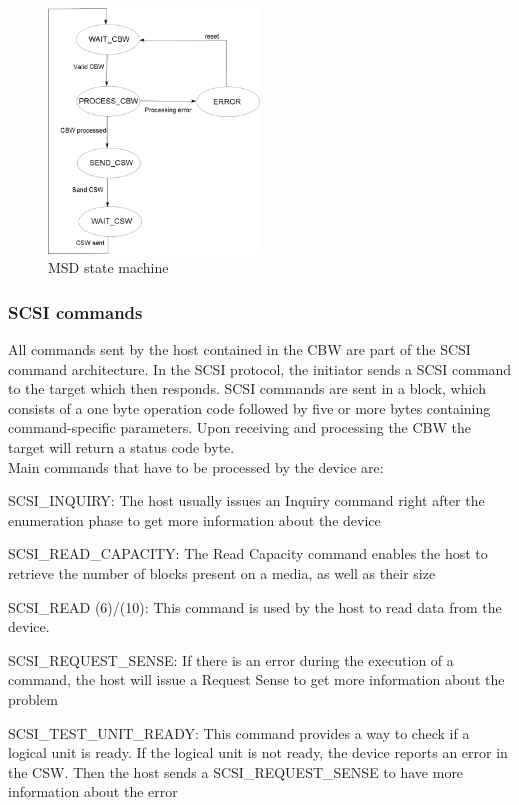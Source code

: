 \documentclass[pdftex,10pt,a4paper]{report}
\newenvironment{packed_item}{
\begin{itemize}
  \setlength{\itemsep}{1pt}
  \setlength{\parskip}{0pt}
  \setlength{\parsep}{0pt}
}{\end{itemize}}
\begin{document}
\begin{figure}[h!]
		\centering
		\includegraphics[width=0.5\textwidth]{./msd_state_machine.jpg}
		\caption{MSD state machine}
		\label{MSD state machine}
\end{figure}


\subsubsection{SCSI commands}
All commands sent by the host contained in the CBW are part of the SCSI command architecture. In the SCSI protocol, the initiator sends a SCSI command to the target which then responds. SCSI commands are sent in a block, which consists of a one byte operation code followed by five or more bytes containing command-specific parameters. Upon receiving and processing the CBW the target will return a status code byte.\\


Main commands that have to be processed by the device are:
\begin{packed_item}
	\item SCSI\_INQUIRY: The host usually issues an Inquiry command right after the enumeration phase to get more
information about the device

	\item SCSI\_READ\_CAPACITY: The Read Capacity command enables the host to retrieve the number of blocks present on a
media, as well as their size

	\item SCSI\_READ (6)/(10): This command is used by the host to read data from the device.
	
	\item SCSI\_REQUEST\_SENSE: If there is an error during the execution of a command, the host will issue a
Request Sense to get more information about the problem

	\item SCSI\_TEST\_UNIT\_READY: This command provides a way to check if a logical unit is ready. If the logical unit is not ready, the device reports an error in the CSW. Then the host sends a SCSI\_REQUEST\_SENSE to have more information about the error
\end{packed_item}
\end{document}
